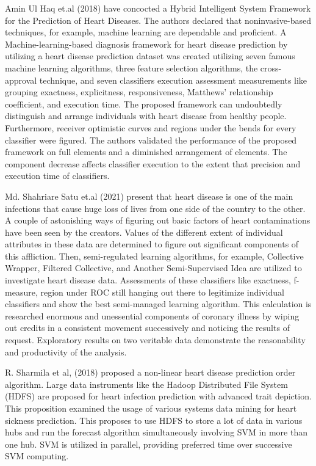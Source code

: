 Amin Ul Haq et.al (2018) have concocted a Hybrid Intelligent System Framework for the Prediction of Heart Diseases. The authors declared that noninvasive-based techniques, for example, machine learning are dependable and proficient. A Machine-learning-based diagnosis framework for heart disease prediction by utilizing a heart disease prediction dataset was created utilizing seven famous machine learning algorithms, three feature selection algorithms, the cross-approval technique, and seven classifiers execution assessment measurements like grouping exactness, explicitness, responsiveness, Matthews' relationship coefficient, and execution time. The proposed framework can undoubtedly distinguish and arrange individuals with heart disease from healthy people. Furthermore, receiver optimistic curves and regions under the bends for every classifier were figured. The authors validated the performance of the proposed framework on full elements and a diminished arrangement of elements. The component decrease affects classifier execution to the extent that precision and execution time of classifiers.

Md. Shahriare Satu et.al (2021) present that heart disease is one of the main infections that cause huge loss of lives from one side of the country to the other. A couple of astonishing ways of figuring out basic factors of heart contaminations have been seen by the creators. Values of the different extent of individual attributes in these data are determined to figure out significant components of this affliction. Then, semi-regulated learning algorithms, for example, Collective Wrapper, Filtered Collective, and Another Semi-Supervised Idea are utilized to investigate heart disease data. Assessments of these classifiers like exactness, f-measure, region under ROC still hanging out there to legitimize individual classifiers and show the best semi-managed learning algorithm. This calculation is researched enormous and unessential components of coronary illness by wiping out credits in a consistent movement successively and noticing the results of request. Exploratory results on two veritable data demonstrate the reasonability and productivity of the analysis.

R. Sharmila et al, (2018) proposed a non-linear heart disease prediction order algorithm. Large data instruments like the Hadoop Distributed File System (HDFS) are proposed for heart infection prediction with advanced trait depiction. This proposition examined the usage of various systems data mining for heart sickness prediction. This proposes to use HDFS to store a lot of data in various hubs and run the forecast algorithm simultaneously involving SVM in more than one hub. SVM is utilized in parallel, providing preferred time over successive SVM computing.
